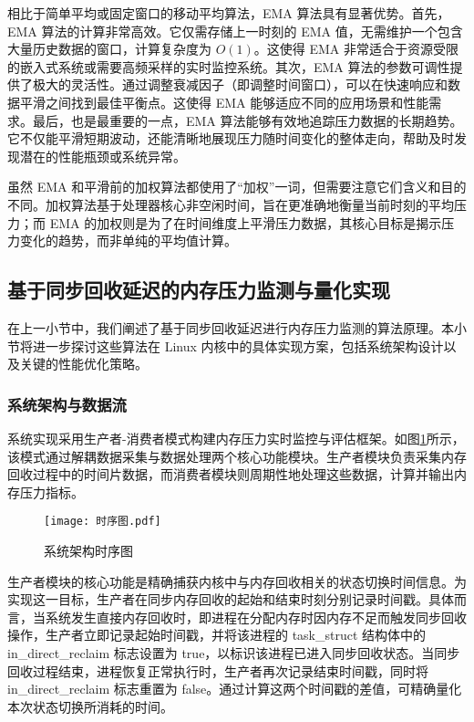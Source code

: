 相比于简单平均或固定窗口的移动平均算法，EMA 算法具有显著优势。首先，EMA 算法的计算非常高效。它仅需存储上一时刻的 EMA 值，无需维护一个包含大量历史数据的窗口，计算复杂度为 \(O(1)\)。这使得 EMA 非常适合于资源受限的嵌入式系统或需要高频采样的实时监控系统。其次，EMA 算法的参数可调性提供了极大的灵活性。通过调整衰减因子（即调整时间窗口），可以在快速响应和数据平滑之间找到最佳平衡点。这使得 EMA 能够适应不同的应用场景和性能需求。最后，也是最重要的一点，EMA 算法能够有效地追踪压力数据的长期趋势。它不仅能平滑短期波动，还能清晰地展现压力随时间变化的整体走向，帮助及时发现潜在的性能瓶颈或系统异常。

虽然 EMA 和平滑前的加权算法都使用了“加权”一词，但需要注意它们含义和目的不同。加权算法基于处理器核心非空闲时间，旨在更准确地衡量当前时刻的平均压力；而 EMA 的加权则是为了在时间维度上平滑压力数据，其核心目标是揭示压力变化的趋势，而非单纯的平均值计算。

\subsection{基于同步回收延迟的内存压力监测与量化实现}

在上一小节中，我们阐述了基于同步回收延迟进行内存压力监测的算法原理。本小节将进一步探讨这些算法在 Linux 内核中的具体实现方案，包括系统架构设计以及关键的性能优化策略。

\subsubsection{系统架构与数据流}


系统实现采用生产者-消费者模式构建内存压力实时监控与评估框架。如图\ref{时序图}所示，该模式通过解耦数据采集与数据处理两个核心功能模块。生产者模块负责采集内存回收过程中的时间片数据，而消费者模块则周期性地处理这些数据，计算并输出内存压力指标。

\begin{figure}[h]
\texttt{[image: 时序图.pdf]}
\caption{系统架构时序图}
\label{时序图}
\end{figure}

生产者模块的核心功能是精确捕获内核中与内存回收相关的状态切换时间信息。为实现这一目标，生产者在同步内存回收的起始和结束时刻分别记录时间戳。具体而言，当系统发生直接内存回收时，即进程在分配内存时因内存不足而触发同步回收操作，生产者立即记录起始时间戳，并将该进程的 task\_struct 结构体中的 in\_direct\_reclaim 标志设置为 true，以标识该进程已进入同步回收状态。当同步回收过程结束，进程恢复正常执行时，生产者再次记录结束时间戳，同时将 in\_direct\_reclaim 标志重置为 false。通过计算这两个时间戳的差值，可精确量化本次状态切换所消耗的时间。

